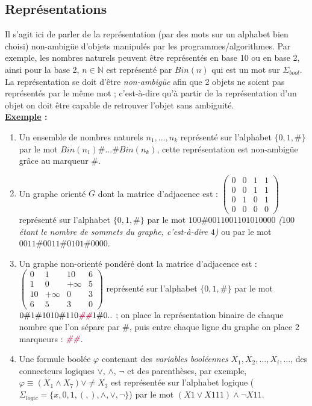 \documentclass{article}
\newcommand{\titre}[1]{\textcolor{title}{#1}}
\newcommand{\tssect}[1]{\titre{\subsection{#1}}}
\newcommand{\term}[1]{\textit{\textcolor{maintitle}{#1}}}
\newcommand{\N}{\mathbb{N}}
\begin{document}
\begin{sffamily}
\tssect{Représentations}

Il s'agit ici de parler de la représentation (par des mots sur un alphabet bien choisi) non-ambigüe d'objets manipulés 
par les programmes/algorithmes. Par exemple, les nombres naturels peuvent être représentés en base 10 ou en base 2, 
ainsi pour la base 2, $n \in \N$ est représenté par $Bin(n)$ qui est un mot sur $\Sigma_{bool}$. La représentation se
doit d'être \term{non-ambigüe} afin que 2 objets ne soient pas représentés par le même mot ; c'est-à-dire qu'à partir 
de la représentation d'un objet on doit être capable de retrouver l'objet sans ambiguité.\\

\noindent \textbf{\underline{Exemple} :} \\

\begin{enumerate}
\item Un ensemble de nombres naturels $n_1,...,n_k$ représenté sur l'alphabet $\{0,1,\#\}$ par le mot $Bin(n_1)\# ... 
\# Bin(n_k)$, cette représentation est non-ambigüe grâce au marqueur $\#$.
\item Un graphe orienté $G$ dont la matrice d'adjacence est :
 $ \begin{pmatrix}
0 & 0 & 1 & 1 \\
0 & 0 & 1 & 1 \\
0 & 1 & 0 & 1 \\
0 & 0 & 0 & 0
\end{pmatrix}$ représenté sur l'alphabet $\{0,1,\#\}$ par le mot $100\#0011001101010000$ \textit{($100$ étant le nombre 
de sommets du graphe, c'est-à-dire $4$)} ou par le mot $0011\#0011\#0101\#0000$.
\item Un graphe non-orienté pondéré dont la matrice d'adjacence est :
 $ \begin{pmatrix}
0 & 1 & 10 & 6 \\
1 & 0 & +\infty & 5 \\
10 & +\infty & 0 & 3 \\
6 & 5 & 3 & 0
\end{pmatrix}$ représenté sur l'alphabet $\{0,1,\#\}$ par le mot $0\#1\#1010\#110\term{\#\#}1\#0..$ ; on place la 
représentation binaire de chaque nombre que l'on sépare par $\#$, puis entre chaque ligne du graphe on place 2 
marqueurs : $\term{\#\#}$.
\item Une formule boolée $\varphi$ contenant des \textit{variables booléennes} $X_1,X_2,...,X_i,...$, des connecteurs 
logiques $\vee$, $\wedge$, $\neg$ et des parenthèses, par exemple, $\varphi \equiv (X_1 \wedge X_7) \vee \neq X_3$ est 
représentée sur l'alphabet logique ($\Sigma_{logic} = \{x,0,1,(,),\wedge,\vee,\neg\}$) par le mot 
$(X1\vee X111)\wedge\neg X11$. \\
\end{enumerate}


\end{sffamily}
\end{document}
